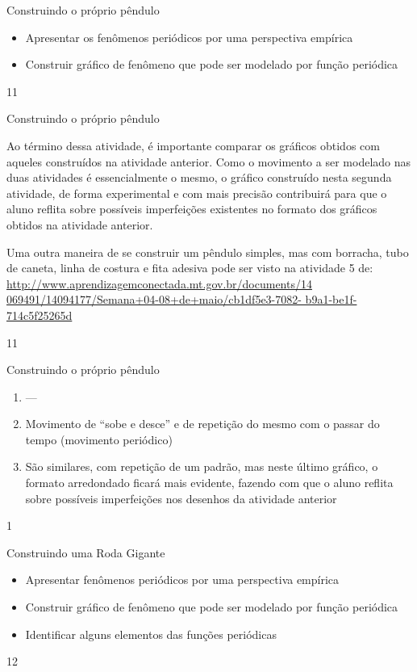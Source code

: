 \clearmargin
\clearmargin
\begin{objectives}{Construindo o próprio pêndulo}
{
\begin{itemize}
\item Apresentar os fenômenos periódicos por uma perspectiva
empírica
\item Construir gráfico de fenômeno que pode ser modelado por
função periódica
\end{itemize}
}{1}{1}
\end{objectives}
\begin{sugestions}{Construindo o próprio pêndulo}
{
Ao término dessa atividade, é importante comparar
os gráficos obtidos com aqueles construídos na atividade
anterior. Como o movimento a ser modelado nas duas
atividades é essencialmente o mesmo, o gráfico construído
nesta segunda atividade, de forma experimental e com mais
precisão contribuirá para que o aluno reflita sobre possíveis
imperfeições existentes no formato dos gráficos obtidos na
atividade anterior.

Uma outra maneira de se construir um pêndulo simples, mas
com borracha, tubo de caneta, linha de costura e fita adesiva
pode ser visto na atividade 5 de: \url{http://www.aprendizagemconectada.mt.gov.br/documents/14
069491/14094177/Semana+04-08+de+maio/cb1df5e3-7082-
b9a1-be1f-714c5f25265d}
}{1}{1}
\end{sugestions}
\clearmargin
\vspace{.5em}
\begin{answer}{Construindo o próprio pêndulo}
{
\begin{enumerate}
\item ---
\item Movimento de “sobe e desce”{} e de repetição do mesmo
com o passar do tempo (movimento periódico)
\item São similares, com repetição de um padrão, mas neste
último gráfico, o formato arredondado ficará mais evidente,
fazendo com que o aluno reflita sobre possíveis imperfeições
nos desenhos da atividade anterior
\end{enumerate}
}{1}
\end{answer}
\begin{objectives}{Construindo uma Roda Gigante}
{
\begin{itemize}
\item Apresentar fenômenos periódicos por uma perspectiva
empírica
\item Construir gráfico de fenômeno que pode ser modelado por
função periódica
\item Identificar alguns elementos das funções periódicas
\end{itemize}
}{1}{2}
\end{objectives}
